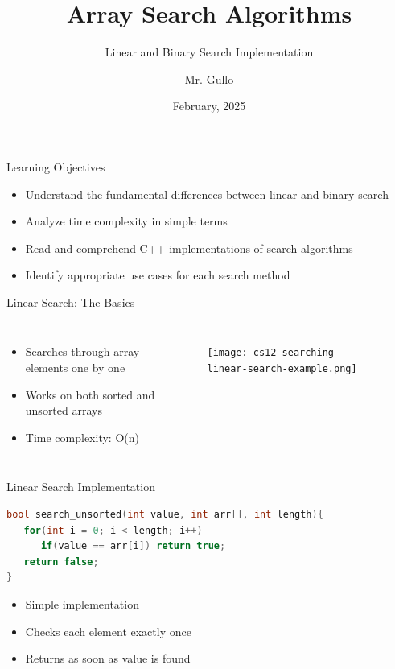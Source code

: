 \documentclass{beamer}
\title[Array Searching]{ Array Search Algorithms}
\subtitle{Linear and Binary Search Implementation}
\author[Mr. Gullo]{Mr. Gullo}
\date[Feb 2025]{February, 2025}
\begin{document}
\frame{\titlepage}

\begin{frame}{Learning Objectives}
\begin{itemize}
\item Understand the fundamental differences between linear and binary search
\item Analyze time complexity in simple terms
\item Read and comprehend C++ implementations of search algorithms
\item Identify appropriate use cases for each search method
\end{itemize}
\end{frame}

\begin{frame}{Linear Search: The Basics}
\begin{columns}
\begin{itemize}
\item Searches through array elements one by one
\item Works on both sorted and unsorted arrays
\item Time complexity: O(n)
\end{itemize}

\begin{figure}
    \centering
    \texttt{[image: cs12-searching-linear-search-example.png]}
\end{figure}
\end{columns}
\end{frame}

\begin{frame}[fragile]{Linear Search Implementation}
\begin{lstlisting}[language=C++]
bool search_unsorted(int value, int arr[], int length){
   for(int i = 0; i < length; i++)
      if(value == arr[i]) return true;
   return false;
}
\end{lstlisting}
\pause

\begin{itemize}
\item Simple implementation
\item Checks each element exactly once
\item Returns as soon as value is found
\end{itemize}
\end{frame}
\end{document}

